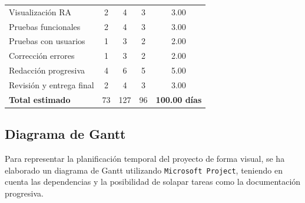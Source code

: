 \begin{table}[H]
\begin{tabular}{|l|c|c|c|c|}
Visualización RA & 2 & 4 & 3 & 3.00 \\
Pruebas funcionales & 2 & 4 & 3 & 3.00 \\
Pruebas con usuarios & 1 & 3 & 2 & 2.00 \\
Corrección errores & 1 & 3 & 2 & 2.00 \\
Redacción progresiva & 4 & 6 & 5 & 5.00 \\
Revisión y entrega final & 2 & 4 & 3 & 3.00 \\
\hline
\textbf{Total estimado} & 73 & 127 & 96 & \textbf{100.00 días} \\
\hline
\end{tabular}
\end{table}

\subsection{Diagrama de Gantt}

Para representar la planificación temporal del proyecto de forma visual, se ha elaborado un diagrama de Gantt utilizando \texttt{Microsoft Project}, teniendo en cuenta las dependencias y la posibilidad de solapar tareas como la documentación progresiva.

